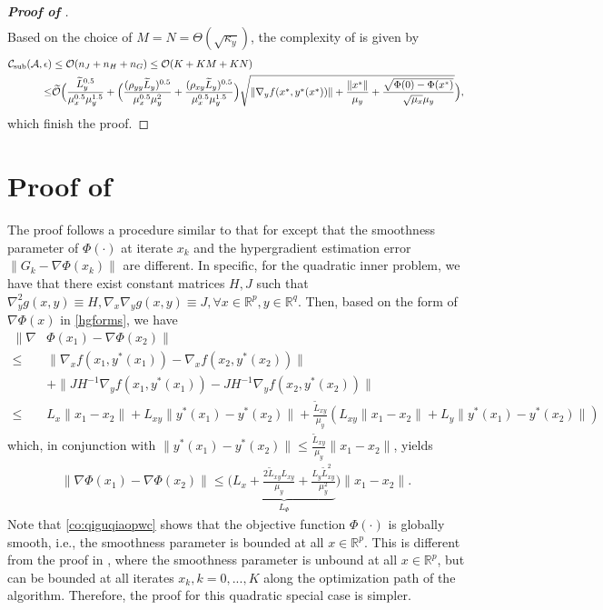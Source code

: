 \documentclass{osudissert96}
\begin{document}
\begin{proof}[{\bf Proof of }]
{\begin{align}
\end{align}}
\hspace{-0.13cm}Based on the choice of $M=N=\Theta(\sqrt{\kappa_y})$,  the complexity of  is given by 
{\footnotesize
\begin{align*}
\mathcal{C}_{\text{\normalfont sub}}(\mathcal{A},\epsilon) &\leq \mathcal{O}(n_J+n_H + n_G)\leq \mathcal{O}(K+KM+KN)   \nonumber
\\\leq& \mathcal{\widetilde O}\Big(\frac{\widetilde L_y^{0.5}}{\mu_x^{0.5}\mu_y^{1.5}}+\Big(\frac{ (\rho_{yy}\widetilde L_y)^{0.5}}{\mu_x^{0.5}\mu_y^{2}} +  \frac{(\rho_{xy}\widetilde L_y)^{0.5}}{\mu_x^{0.5}\mu_y^{1.5}}\Big)\sqrt{\|\nabla_y f( x^*,y^*(x^*))\|+\frac{\|x^*\|}{\mu_y}+\frac{\sqrt{\Phi(0)-\Phi(x^*)}}{\sqrt{\mu_x}\mu_y}}\Big),
\end{align*}}
\hspace{-0.13cm}which finish the proof. 
\end{proof}

\section{Proof of }\label{proof:coUsrwB}
The proof follows a procedure similar to that for  except that the smoothness parameter of $\Phi(\cdot)$ at iterate $x_k$  and the hypergradient estimation error $\|G_k-\nabla\Phi(x_k)\|$ are different. In specific, for the quadratic inner problem, we have that there exist constant matrices $H,J$ such that 
$\nabla_y^2 g (x,y) 	\equiv H, \nabla_x\nabla_y g(x,y) \equiv J, \forall  x\in\mathbb{R}^p, y\in \mathbb{R}^q$. Then, based on the form of $\nabla \Phi(x)$ in \cref{hgforms}, we have 
\begin{align*}
\|\nabla&\Phi(x_1) - \nabla\Phi(x_2)\| \nonumber
\\\leq& \|\nabla_x f(x_1,y^*(x_1)) -\nabla_x f(x_2,y^*(x_2))  \| \nonumber
\\&+ \|JH^{-1}\nabla_y f(x_1,y^*(x_1)) -JH^{-1}\nabla_y f(x_2,y^*(x_2))\| \nonumber
\\  \leq & L_x\|x_1-x_2\| + L_{xy}\|y^*(x_1)-y^*(x_2)\| + \frac{\widetilde L_{xy}}{\mu_y}(L_{xy}\|x_1-x_2\|+L_y\|y^*(x_1)-y^*(x_2)\|)
\end{align*}
which, in conjunction with $\|y^*(x_1)-y^*(x_2)\|\leq \frac{\widetilde L_{xy}}{\mu_y} \|x_1-x_2\|$, yields 
\begin{align}\label{co:qiguqiaopwc}
\|\nabla\Phi(x_1) - \nabla\Phi(x_2)\| \leq \Big(\underbrace{ L_x + \frac{2\widetilde L_{xy}L_{xy}}{\mu_y} +\frac{L_y\widetilde L_{xy}^2}{\mu_y^2} }_{L_\Phi} \Big) \|x_1-x_2\|.
\end{align}
Note that \cref{co:qiguqiaopwc} shows that the objective function $\Phi(\cdot)$ is globally smooth, i.e., the smoothness parameter is bounded at all $x\in\mathbb{R}^p$. This is different from the proof in , where the smoothness parameter is unbound at all $x\in\mathbb{R}^p$, but can be bounded at all iterates $x_k,k=0,...,K$ along the optimization path of the algorithm. Therefore, the proof for this quadratic special case is simpler. 
\end{document}
